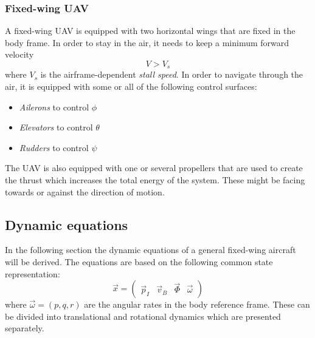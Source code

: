 \subsubsection{Fixed-wing UAV}
A fixed-wing UAV is equipped with two horizontal wings that are fixed in the body frame.
In order to stay in the air, it needs to keep a minimum forward velocity
\begin{equation}
    V > V_{s}
\end{equation}
where $V_s$ is the airframe-dependent \textit{stall speed}. In order to navigate through the
air, it is equipped with some or all of the following control surfaces:
\begin{itemize}
    \item \textit{Ailerons} to control $\phi$
    \item \textit{Elevators} to control $\theta$
    \item \textit{Rudders} to control $\psi$
\end{itemize}
The UAV is also equipped with one or several propellers that are used to create the thrust which
increases the total energy of the system. These might be facing towards or against the direction of motion.

\subsection{Dynamic equations}
In the following section the dynamic equations of a general fixed-wing aircraft will be derived. The 
equations are based on the following common state representation:
\begin{equation}
    \vec{x}=
    \begin{pmatrix}
        \vec{p}_I & \vec{v}_B & \vec{\Phi} & \vec{\omega}
    \end{pmatrix}
\end{equation}
where $\vec{\omega}=(p, q, r)$ are the angular rates in the body reference frame. These can be divided
into translational and rotational dynamics which are presented separately.
